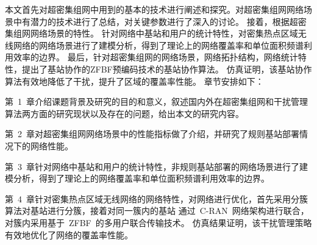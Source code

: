 本文首先对超密集组网中用到的基本的技术进行阐述和探究。对超密集组网网络场景中有潜力的技术进行了总结，对关键参数进行了深入的讨论。
接着，根据超密集组网网络场景的特性。
针对网络中基站和用户的统计特性，对密集热点区域无线网络的网络场景进行了建模分析，得到了理论上的网络覆盖率和单位面积频谱利用效率的边界。
最后，针对超密集组网的网络场景，网络拓扑结构，网络统计特性，提出了基站协作的ZFBF预编码技术的基站协作算法。
仿真证明，该基站协作算法有效地降低了干扰，提升了区域的覆盖率性能。
章节安排如下：

第~1~章介绍课题背景及研究的目的和意义，叙述国内外在超密集组网和干扰管理算法两方面的研究现状以及存在的问题，给出本文的研究内容。

第~2~章对超密集组网网络场景中的性能指标做了介绍，并研究了规则基站部署情况下的网络性能。

第~3~章针对网络中基站和用户的统计特性，非规则基站部署的网络场景进行了建模分析，得到了理论上的网络覆盖率和单位面积频谱利用效率的边界。

第~4~章针对密集热点区域无线网络的网络特性，对网络进行优化，首先采用分簇算法对基站进行分簇，接着对同一簇内的基站
通过~C-RAN~网络架构进行联合，对簇内采用基于~ZFBF~的多用户联合传输技术。
仿真结果证明，该干扰管理策略有效地优化了网络的覆盖率性能。
